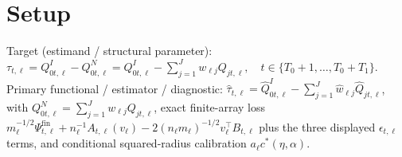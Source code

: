 \documentclass{article}
\begin{document}
\section{Setup}

Target (estimand / structural parameter): \(\tau_{t,\ell}=Q^I_{0t,\ell}-Q^N_{0t,\ell}=Q^I_{0t,\ell}-\sum_{j=1}^Jw_{\ell j}Q_{jt,\ell},\quad t\in\{T_0+1,\ldots,T_0+T_1\}\).
Primary functional / estimator / diagnostic: \(\widehat\tau_{t,\ell}=\widehat Q^I_{0t,\ell}-\sum_{j=1}^J\widehat w_{\ell j}\widehat Q_{jt,\ell}\), with \(Q^N_{0t,\ell}=\sum_{j=1}^Jw_{\ell j}Q_{jt,\ell}\), exact finite-array loss \(m_\ell^{-1/2}\Psi^{\mathrm{fin}}_{t,\ell}+n_\ell^{-1}A_{t,\ell}(v_\ell)-2(n_\ell m_\ell)^{-1/2}v_\ell^\top B_{t,\ell}\) plus the three displayed \(\epsilon_{t,\ell}\) terms, and conditional squared-radius calibration \(a_\ell c^*(\eta,\alpha)\).
\end{document}
